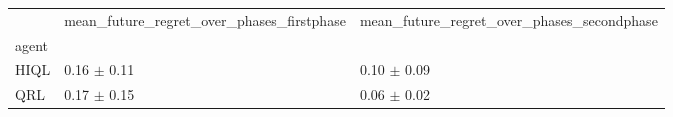 \begin{tabular}{lll}
\toprule
 & mean_future_regret_over_phases_firstphase & mean_future_regret_over_phases_secondphase \\
agent &  &  \\
\midrule
HIQL & 0.16 $\pm$ 0.11 & 0.10 $\pm$ 0.09 \\
QRL & 0.17 $\pm$ 0.15 & 0.06 $\pm$ 0.02 \\
\bottomrule
\end{tabular}
